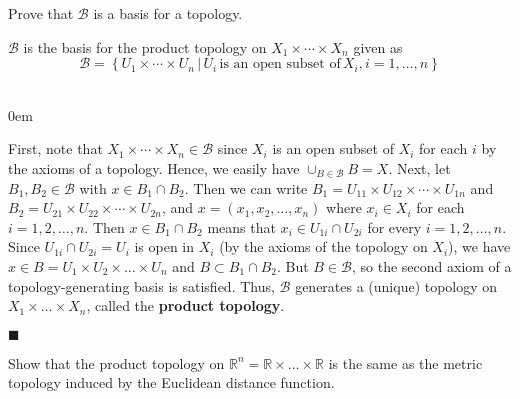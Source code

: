 \documentclass[12pt]{article}
\renewcommand{\qed}{\hfill$\blacksquare$}
\renewenvironment{proof}{\begin{addmargin}[1em]{0em}\begin{newproof}}{\end{newproof}\end{addmargin}\qed}
\newenvironment{exercise}[2][Exercise]{\begin{trivlist}
\item[\hskip \labelsep {\bfseries #1}\hskip \labelsep {\bfseries #2.}]}{\end{trivlist}}
\begin{document}
\begin{exercise}{3.25}
Prove that $\mathcal{B}$ is a basis for a topology.
\end{exercise}
$\mathcal{B}$ is the basis for the product topology on $X_1\times \cdots \times X_n$ given as $$\mathcal{B} = \left\{ U_1 \times \cdots \times U_n \, | \, U_i \, \text{is an open subset of} \, X_i, i=1,\ldots,n\right\}$$ \\
\begin{proof}
First, note that $X_1\times \cdots \times X_n \in \mathcal{B}$ since $X_i$ is an open subset of $X_i$ for each $i$ by the axioms of a topology. Hence, we easily have $\cup_{B\in \mathcal{B}} B = X$. Next, let $B_1,B_2 \in \mathcal{B}$ with $x \in B_1 \cap B_2$. Then we can write $B_1 = U_{11} \times U_{12} \times \cdots \times U_{1n}$ and $B_2 = U_{21} \times U_{22} \times \cdots \times U_{2n}$, and $x = \left(x_1,x_2,\ldots,x_n\right)$ where $x_i \in X_i$ for each $i=1,2,\ldots,n$. Then $x \in B_1 \cap B_2$ means that $x_i \in U_{1i}\cap U_{2i}$ for every $i=1,2,\ldots,n$. Since $U_{1i}\cap U_{2i}=U_i$ is open in $X_i$ (by the axioms of the topology on $X_i$), we have $x \in B = U_1 \times U_2\times \ldots \times U_n $ and $B \subset B_1\cap B_2$. But $B \in \mathcal{B}$, so the second axiom of a topology-generating basis is satisfied. Thus, $\mathcal{B}$ generates a (unique) topology on $X_1\times \ldots \times X_n$, called the \textbf{product topology}.
\end{proof}




\begin{exercise}{3.26}
Show that the product topology on $\mathbb{R}^n = \mathbb{R}\times \ldots \times \mathbb{R}$ is the same as the metric topology induced by the Euclidean distance function.
\end{exercise}
\end{document}
